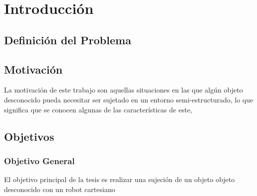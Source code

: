 \chapter{Introducción}\label{intro}

\section{Definición del Problema}



\section{Motivación}
La motivación de este trabajo son aquellas situaciones en las que algún objeto desconocido pueda necesitar ser  sujetado en un entorno semi-estructurado, lo que significa que se conocen algunas de las características de este,

\section{Objetivos}

\subsection{Objetivo General}

El objetivo principal de la tesis es realizar una sujeción de un objeto objeto desconocido con un robot cartesiano

